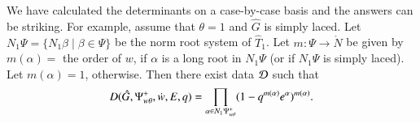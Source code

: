 \begin{remark}
  We have calculated the determinants on a case-by-case basis and the
  answers can be striking.  For example, assume that $\theta=1$ and
  $\hat G$ is simply laced.  Let
  $N_1\Psi=\{N_1\beta\mid \beta\in \Psi\}$ be the norm root system of
  $\hat T_1$.  Let $m:\Psi\to \ring{N}$ be given by $m(\alpha)=$ the
  order of $w$, if $\alpha$ is a long root in $N_1\Psi$ (or if
  $N_1\Psi$ is simply laced).  Let $m(\alpha) = 1$, otherwise.  Then
  there exist data $\mathcal D$ such that
\begin{equation}\label{eqn:laced0}
D(\hat G,\Psi_{w\theta}^+,\dot w,E,q) 
= \prod_{\alpha\in N_1\Psi_{w\theta}^{+}} (1- q^{m(\alpha)} e^\alpha)^{m(\alpha)}.
\end{equation}
\end{remark}

